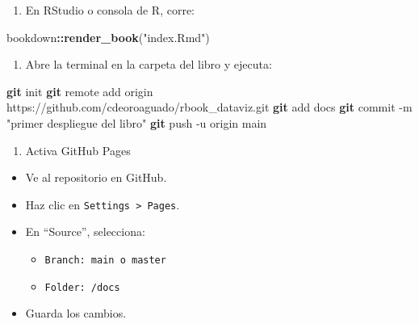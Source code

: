 \documentclass[
]{book}
\newenvironment{Shaded}{\begin{snugshade}}{\end{snugshade}}
\newcommand{\AttributeTok}[1]{\textcolor[rgb]{0.13,0.29,0.53}{#1}}
\newcommand{\FunctionTok}[1]{\textcolor[rgb]{0.13,0.29,0.53}{\textbf{#1}}}
\newcommand{\NormalTok}[1]{#1}
\newcommand{\SpecialCharTok}[1]{\textcolor[rgb]{0.81,0.36,0.00}{\textbf{#1}}}
\newcommand{\StringTok}[1]{\textcolor[rgb]{0.31,0.60,0.02}{#1}}
\providecommand{\tightlist}{%
  \setlength{\itemsep}{0pt}\setlength{\parskip}{0pt}}
\begin{document}
\begin{enumerate}
\def\labelenumi{\arabic{enumi}.}
\setcounter{enumi}{2}
\tightlist
\item
  En RStudio o consola de R, corre:
\end{enumerate}

\begin{Shaded}
\begin{Highlighting}[]
\NormalTok{bookdown}\SpecialCharTok{::}\FunctionTok{render\_book}\NormalTok{(}\StringTok{"index.Rmd"}\NormalTok{)}
\end{Highlighting}
\end{Shaded}

\begin{enumerate}
\def\labelenumi{\arabic{enumi}.}
\setcounter{enumi}{3}
\tightlist
\item
  Abre la terminal en la carpeta del libro y ejecuta:
\end{enumerate}

\begin{Shaded}
\begin{Highlighting}[]
\FunctionTok{git}\NormalTok{ init}
\FunctionTok{git}\NormalTok{ remote add origin https://github.com/cdeoroaguado/rbook\_dataviz.git}
\FunctionTok{git}\NormalTok{ add docs}
\FunctionTok{git}\NormalTok{ commit }\AttributeTok{{-}m} \StringTok{"primer despliegue del libro"}
\FunctionTok{git}\NormalTok{ push }\AttributeTok{{-}u}\NormalTok{ origin main }
\end{Highlighting}
\end{Shaded}

\begin{enumerate}
\def\labelenumi{\arabic{enumi}.}
\setcounter{enumi}{4}
\tightlist
\item
  Activa GitHub Pages
\end{enumerate}

\begin{itemize}
\item
  Ve al repositorio en GitHub.
\item
  Haz clic en \texttt{Settings\ \textgreater{}\ Pages}.
\item
  En ``Source'', selecciona:

  \begin{itemize}
  \tightlist
  \item
    \texttt{Branch:\ main\ o\ master}
  \item
    \texttt{Folder:\ /docs}
  \end{itemize}
\item
  Guarda los cambios.
\end{itemize}
\end{document}
